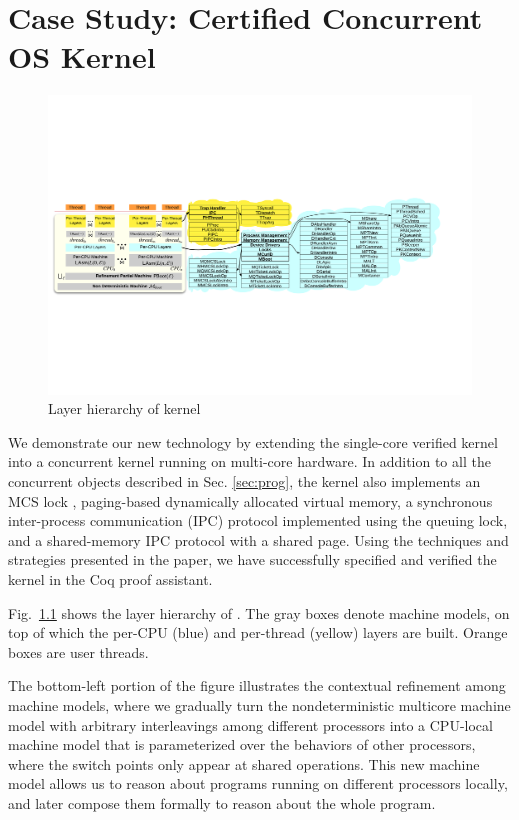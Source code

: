\chapter{Case Study: Certified Concurrent OS Kernel}
\label{chap:conkernel}

\begin{figure}
\includegraphics[width=1.0\textwidth]{figs/layer_diagram.pdf}
\vspace{-20pt}
\caption{Layer hierarchy of \cCTOS{} kernel}
\label{fig:layer_diagram}
\vspace{-10pt}
\end{figure}

We demonstrate our new technology
by extending the \mCTOS{} single-core verified kernel \cite{dscal15} into a
concurrent kernel \cCTOS{} running on multi-core hardware.
In addition to all the concurrent objects described in Sec. \ref{sec:prog},
the kernel also implements an MCS lock \cite{mcs91}, paging-based dynamically
allocated virtual memory,
a synchronous inter-process communication (IPC) protocol implemented using the
queuing lock, and a shared-memory IPC protocol with a shared page.
Using the techniques and strategies presented in the paper, we have
successfully specified and verified the \cCTOS{} kernel in the Coq proof assistant.

Fig.~\ref{fig:layer_diagram} shows the layer hierarchy of  \cCTOS{}.
The gray boxes denote machine models, on top of which the
per-CPU (blue) and per-thread (yellow) layers are built. Orange boxes
are user threads.

The bottom-left portion of the figure illustrates the contextual refinement
among machine models, where we gradually turn the nondeterministic
multicore machine model with arbitrary interleavings
among different processors into a CPU-local machine model that is parameterized
over the behaviors of other processors,
where the switch points only appear at shared operations. This new machine
model allows us to reason about programs running on different processors locally,
and later compose them formally to reason about the whole program.

